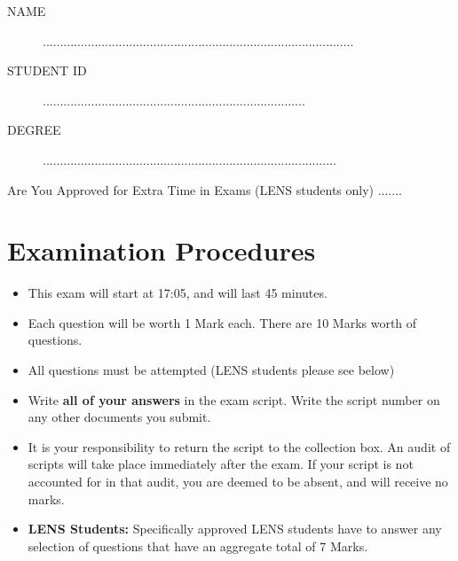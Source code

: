 \documentclass[11pt]{article} %
\begin{document}
	
	
	
	
	\Large
\newpage

\begin{framed}
\begin{description}
\item[NAME]  ..........................................................................................
\bigskip
\item[STUDENT ID] ............................................................................
\bigskip
\item[DEGREE] .....................................................................................
\end{description}
\end{framed}
\noindent Are You Approved for Extra Time in Exams (LENS students only)  .......
\section*{Examination Procedures}
\begin{itemize} 
	\item This exam will start at 17:05, and will last 45 minutes.
		\item Each question will be worth 1 Mark each. There are 10 Marks worth of questions.
	\item All questions must be attempted (LENS students please see below)
		\item Write \textbf{all of your answers} in the exam script. Write the script number on any other documents you submit.
		\item It is your responsibility to return the script to the collection box. 
		An audit of scripts will take place immediately after the exam. If your script is not accounted for in that audit,  you are deemed to be absent, and will receive no marks.
	
	\item \textbf{LENS Students: }
	Specifically approved LENS students have to answer any selection of questions that have an aggregate total of 7 Marks.  

	
	
\end{itemize}
\end{document}
